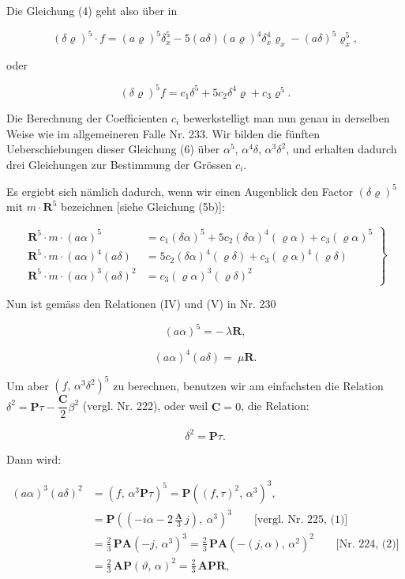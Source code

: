 \documentclass[11pt]{article}
\providecommand{\weberpage}[1]{}
\providecommand{\weq}[2]{\begin{equation}\tag{#1}#2\end{equation}}
\begin{document}
Die Gleichung (4) geht also über in

\[
(\delta\varrho)^5\cdot f = (a\varrho)^5\delta_x^5 - 5(a\delta)(a\varrho)^4\delta_x^4\varrho_x - (a\delta)^5\varrho_x^5,
\]

oder

\weq{6}{
(\delta\varrho)^5f = c_1\delta^5 + 5c_2\delta^4\varrho + c_3\varrho^5.
}


\weberpage{259}
Die Berechnung der Coefficienten $c_i$ bewerkstelligt man nun genau
in derselben Weise wie im allgemeineren Falle Nr. 233. Wir bilden
die fünften Ueberschiebungen dieser Gleichung (6) über $\alpha^5$, $\alpha^4\delta$, $\alpha^3\delta^2$,
und erhalten dadurch drei Gleichungen zur Bestimmung der Grössen $c_i$.

Es ergiebt sich nämlich dadurch, wenn wir einen Augenblick den
Factor $(\delta\varrho)^5$ mit $m\cdot\mathbf{R}^5$ bezeichnen [siehe Gleichung (5b)]:

\weq{6a}{
\left.
\begin{aligned}
\mathbf{R}^5\cdot m\cdot(a\alpha)^5 &= c_1(\delta\alpha)^5 + 5c_2(\delta\alpha)^4(\varrho\alpha) + c_3(\varrho\alpha)^5\\
\mathbf{R}^5\cdot m\cdot(a\alpha)^4(a\delta) &= 5c_2(\delta\alpha)^4(\varrho\delta) + c_3(\varrho\alpha)^4(\varrho\delta)\\
\mathbf{R}^5\cdot m\cdot(a\alpha)^3(a\delta)^2 &= c_3(\varrho\alpha)^3(\varrho\delta)^2
\end{aligned}
\right\}
}

Nun ist gemäss den Relationen (IV) und (V) in Nr. 230

\weq{7}{
(a\alpha)^5 = -\,\lambda\mathbf{R},
}

\[
(a\alpha)^4(a\delta) = \ \mu\mathbf{R}.
\]

Um aber $(f,\,\alpha^3\delta^2)^5$ zu berechnen, benutzen wir am einfachsten
die Relation $\delta^2 = \mathbf{P}\tau - \dfrac{\mathbf{C}}{2}\beta^2$ (vergl. Nr. 222), oder weil $\mathbf{C} = 0$, die
Relation:

\[
\delta^2 = \mathbf{P}\tau.
\]

Dann wird:

\[
\begin{aligned}
(a\alpha)^3(a\delta)^2 &= (f,\,\alpha^3\mathbf{P}\tau)^5 = \mathbf{P}((f,\tau)^2,\,\alpha^3)^3,\\
&= \mathbf{P}\left(\left(-i\alpha - 2\,\frac{\mathbf{A}}{3}\,j\right),\ \alpha^3\right)^3 \qquad \text{[vergl. Nr. 225, (1)]}\\
&= \frac23\,\mathbf{P}\mathbf{A}(-j,\,\alpha^3)^3 = \frac23\,\mathbf{P}\mathbf{A}(-(j,\alpha),\,\alpha^2)^2 \qquad \text{[Nr. 224, (2)]}\\
&= \frac23\,\mathbf{A}\mathbf{P}(\vartheta,\,\alpha)^2 = \frac23\,\mathbf{A}\mathbf{P}\mathbf{R},
\end{aligned}
\]
\end{document}
